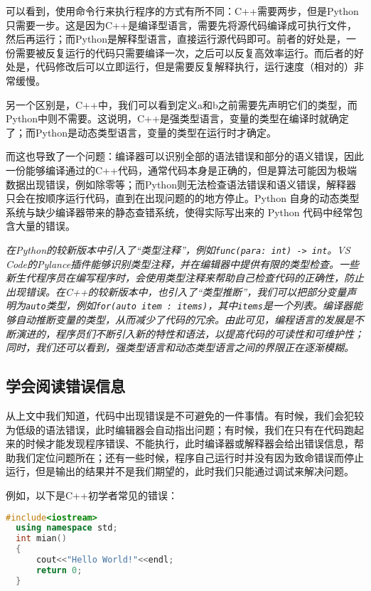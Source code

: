 \documentclass[../main.tex]{subfiles}
\begin{document}
可以看到，使用命令行来执行程序的方式有所不同：C++需要两步，但是Python只需要一步。这是因为C++是编译型语言，需要先将源代码编译成可执行文件，然后再运行；而Python是解释型语言，直接运行源代码即可。前者的好处是，一份需要被反复运行的代码只需要编译一次，之后可以反复高效率运行。而后者的好处是，代码修改后可以立即运行，但是需要反复解释执行，运行速度（相对的）非常缓慢。

另一个区别是，C++中，我们可以看到定义a和b之前需要先声明它们的类型，而Python中则不需要。这说明，C++是强类型语言，变量的类型在编译时就确定了；而Python是动态类型语言，变量的类型在运行时才确定。

而这也导致了一个问题：编译器可以识别全部的语法错误和部分的语义错误，因此一份能够编译通过的C++代码，通常代码本身是正确的，但是算法可能因为极端数据出现错误，例如除零等；而Python则无法检查语法错误和语义错误，解释器只会在按顺序运行代码，直到在出现问题的的地方停止。Python 自身的动态类型系统与缺少编译器带来的静态查错系统，使得实际写出来的 Python 代码中经常包含大量的错误。

\emph{在Python的较新版本中引入了“类型注释”，例如\texttt{func(para: int) -> int}。VS Code的Pylance插件能够识别类型注释，并在编辑器中提供有限的类型检查。一些新生代程序员在编写程序时，会使用类型注释来帮助自己检查代码的正确性，防止出现错误。在C++的较新版本中，也引入了“类型推断”，我们可以把部分变量声明为\texttt{auto}类型，例如\texttt{for(auto item : items)}，其中\texttt{items}是一个列表。编译器能够自动推断变量的类型，从而减少了代码的冗余。由此可见，编程语言的发展是不断演进的，程序员们不断引入新的特性和语法，以提高代码的可读性和可维护性；同时，我们还可以看到，强类型语言和动态类型语言之间的界限正在逐渐模糊。}

\subsection{学会阅读错误信息}

从上文中我们知道，代码中出现错误是不可避免的一件事情。有时候，我们会犯较为低级的语法错误，此时编辑器会自动指出问题；有时候，我们在只有在代码跑起来的时候才能发现程序错误、不能执行，此时编译器或解释器会给出错误信息，帮助我们定位问题所在；还有一些时候，程序自己运行时并没有因为致命错误而停止运行，但是输出的结果并不是我们期望的，此时我们只能通过调试来解决问题。

例如，以下是C++初学者常见的错误：

\begin{lstlisting}[language=C++]
  #include<iostream>
  using namespace std;
  int mian()
  {
      cout<<"Hello World!"<<endl;
      return 0;
  }
\end{lstlisting}
\end{document}
